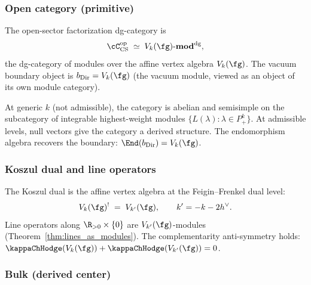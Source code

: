 \subsubsection*{Open category (primitive)}

\begin{definition}
\label{def:cs-open-category}
The open-sector factorization dg-category is
\begin{equation}\label{eq:cs-open-category}
\cC_{\mathrm{CS}}^{\mathrm{op}}
\;\simeq\;
V_k(\fg)\text{-}\mathbf{mod}^{\mathrm{dg}},
\end{equation}
the dg-category of modules over the affine vertex algebra
$V_k(\fg)$.
The vacuum boundary object is
$b_{\mathrm{Dir}} = V_k(\fg)$
(the vacuum module, viewed as an object of its own module
category).
\end{definition}

At generic $k$ (not admissible), the category is abelian and semisimple on the subcategory of integrable highest-weight modules $\{L(\lambda) : \lambda \in P_+^k\}$. At admissible levels, null vectors give the category a derived structure. The endomorphism algebra recovers the boundary: $\End(b_{\mathrm{Dir}}) = V_k(\fg)$.

\subsubsection*{Koszul dual and line operators}

The Koszul dual is the affine vertex algebra at the
Feigin--Frenkel dual level:
\begin{equation}\label{eq:cs-koszul-dual}
V_k(\fg)^!
\;=\;
V_{k'}(\fg),
\qquad
k' = -k - 2h^\vee.
\end{equation}
Line operators along $\R_{>0} \times \{0\}$ are
$V_{k'}(\fg)$-modules
(Theorem~\ref{thm:lines_as_modules}).
The complementarity anti-symmetry holds:
$\kappaChHodge(V_k(\fg)) + \kappaChHodge(V_{k'}(\fg)) = 0$.

\subsubsection*{Bulk (derived center)}

